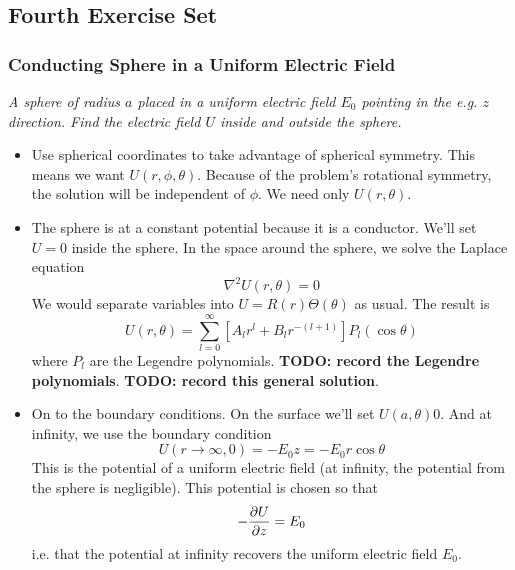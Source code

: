 \documentclass[11pt, a4paper]{article}
\renewcommand{\laplacian}{\nabla^{2}}
\begin{document}
\subsection{Fourth Exercise Set}


\subsubsection{Conducting Sphere in a Uniform Electric Field}
\textit{A sphere of radius $ a $ placed in a uniform electric field $ E_{0} $ pointing in the e.g. $ z $ direction. Find the electric field $ U $ inside and outside the sphere.} 

\begin{itemize}
	\item Use spherical coordinates to take advantage of spherical symmetry. This means we want $ U(r, \phi, \theta) $. Because of the problem's rotational symmetry, the solution will be independent of $ \phi $. We need only $ U(r, \theta) $. 
	
	\item The sphere is at a constant potential because it is a conductor. We'll set $ U = 0 $ inside the sphere. In the space around the sphere, we solve the Laplace equation
	\begin{equation*}
		\laplacian U(r, \theta) = 0
	\end{equation*}
	We would separate variables into $ U = R(r)\Theta(\theta) $ as usual. The result is
	\begin{equation*}
		U(r, \theta) = \sum_{l = 0}^{\infty} \left[A_{l}r^{l}+B_{l}r^{-(l+1)}\right]P_{l}(\cos \theta)
	\end{equation*}
	where $ P_{l} $ are the Legendre polynomials. \textbf{TODO: record the Legendre polynomials}.  \textbf{TODO: record this general solution}. 
	
	\item On to the boundary conditions. On the surface we'll set $ U(a, \theta) 0 $. And at infinity, we use the boundary condition 
	\begin{equation*}
		U(r \to \infty, 0) = - E_{0}z = -E_{0}r \cos \theta
	\end{equation*}
	This is the potential of a uniform electric field (at infinity, the potential from the sphere is negligible). This potential is chosen so that
	\begin{equation*}
		- \pdv{U}{z} = E_{0}
	\end{equation*}
	i.e. that the potential at infinity recovers the uniform electric field $ E_{0} $. 
	

\end{itemize}
\end{document}
